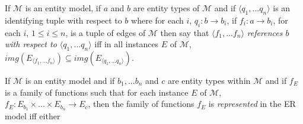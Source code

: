 \documentclass[10pt,a4paper]{article}
\newcommand{\simplepath}[2]{
\ncline[linestyle=dotted,linewidth=0.1pt]{#1}{#2}
\ncput[npos=0.05]{\pnode{dot#21}}
\ncput[npos=0.27]{\dotnode[dotsize=1pt]{dot#22}}
\ncput[npos=0.50]{\dotnode[dotsize=1pt]{dot#23}}
\ncput[npos=0.80]{\dotnode[dotsize=1pt]{dot#24}}
\ncput[npos=0.975]{\pnode{dot#25}}
\ncline[nodesep=3pt]{->}{dot#21}{dot#22}
\ncline[nodesep=3pt]{->}{dot#22}{dot#23}
\ncline[nodesep=3pt]{->}{dot#24}{dot#25}
\ncline[linestyle=dotted,nodesep=10pt]{dot#23}{dot#24}
}
\newcommand{\simplepatha}[3]{
\simplepath{#2}{#3}
\naput[labelsep=1pt]{#1}
}
\newcommand{\simplepathb}[3]{
\simplepath{#2}{#3}
\nbput[labelsep=1pt]{#1}
}
\newcommand{\term}[1]{\textit{{#1}}}
\newcommand{\genericmodel}{\mathcal{M}}
\begin{document}
\begin{definition}
If $\genericmodel$ is an entity model, 
if $a$ and $b$ are entity types of  $\genericmodel$ and  if $\langle q_1,...q_n \rangle$
is an identifying tuple with respect to $b$
 where for each $i$, $q_i: b \rightarrow b_i$,
if  $f_i: a \rightarrow b_i$,  for each $i$,  $1 \leq i \leq n$, is a tuple of edges of $\genericmodel$ 
then say that $\langle f_1,...f_n \rangle$ \term{references $b$ with respect to $\langle q_1,...q_n \rangle$} iff in all instances $E$ of $\genericmodel$,
$img(E_{\langle f_1,...f_n \rangle}) \subseteq img(E_{\langle q_1,...q_n \rangle})$. 
\end{definition}

\begin{definition}
\noindent If $\genericmodel$ is an entity model and if $b_1,...b_n$ and $c$ are entity types within $\genericmodel$ 
and if $f_E$ is a family of functions such that for each instance 
$E$ of $\genericmodel$, 
$f_E: E_{b_1} \times ... \times E_{b_n} \rightarrow E_c$, then the family of functions $f_E$ is \term{represented} in the ER model iff 
either
\end{definition}
\end{document}
